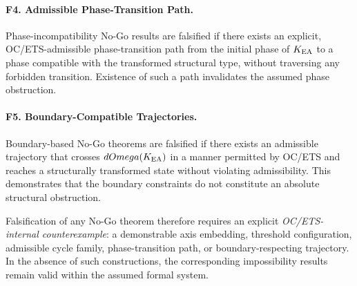 \paragraph{F4. Admissible Phase-Transition Path.}
Phase-incompatibility No-Go results are falsified if there exists an explicit,
OC/ETS-admissible phase-transition path from the initial phase of $K_{\mathrm{EA}}$ to a
phase compatible with the transformed structural type, without traversing any
forbidden transition.
Existence of such a path invalidates the assumed phase obstruction.

\paragraph{F5. Boundary-Compatible Trajectories.}
Boundary-based No-Go theorems are falsified if there exists an admissible
trajectory that crosses $dOmega(K_{\mathrm{EA}})$ in a manner permitted by OC/ETS and reaches
a structurally transformed state without violating admissibility.
This demonstrates that the boundary constraints do not constitute an absolute
structural obstruction.

\begin{remark}
Falsification of any No-Go theorem therefore requires an explicit
\emph{OC/ETS-internal counterexample}: a demonstrable axis embedding, threshold
configuration, admissible cycle family, phase-transition path, or
boundary-respecting trajectory. In the absence of such constructions, the
corresponding impossibility results remain valid within the assumed formal
system.
\end{remark}
